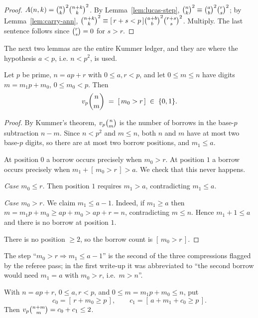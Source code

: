 \begin{proof}
$A(n,k)=\binom{n}{k}^2\binom{n+k}{k}^2$. By Lemma~\ref{lem:lucas-step},
$\binom{n}{k}^2\equiv\binom{a}{b}^2\binom{r}{s}^2$; by Lemma~\ref{lem:carry-ann},
$\binom{n+k}{k}^2\equiv[\,r+s<p\,]\binom{a+b}{b}^2\binom{r+s}{s}^2$. Multiply. The last sentence
follows since $\binom{r}{s}=0$ for $s>r$.
\end{proof}

The next two lemmas are the entire Kummer ledger, and they are where the hypothesis
$a<p$, i.e. $n<p^2$, is used.

\begin{lemma}\label{lem:borrow}
Let $p$ be prime, $n=ap+r$ with $0\le a,r<p$, and let $0\le m\le n$ have digits
$m=m_1p+m_0$, $0\le m_0<p$. Then
\[
  v_p\binom{n}{m}\;=\;[\,m_0>r\,]\;\in\;\{0,1\}.
\]
\end{lemma}

\begin{proof}
By Kummer's theorem, $v_p\binom{n}{m}$ is the number of borrows in the base-$p$ subtraction
$n-m$. Since $n<p^2$ and $m\le n$, both $n$ and $m$ have at most two base-$p$ digits, so
there are at most two borrow positions, and $m_1\le a$.

At position $0$ a borrow occurs precisely when $m_0>r$. At position $1$ a borrow occurs
precisely when $m_1+[\,m_0>r\,]>a$. We check that this never happens.

\emph{Case $m_0\le r$.} Then position $1$ requires $m_1>a$, contradicting $m_1\le a$.

\emph{Case $m_0>r$.} We claim $m_1\le a-1$. Indeed, if $m_1\ge a$ then
$m=m_1p+m_0\ge ap+m_0>ap+r=n$, contradicting $m\le n$. Hence $m_1+1\le a$ and there is no
borrow at position $1$.

There is no position $\ge2$, so the borrow count is $[\,m_0>r\,]$.
\end{proof}

\begin{remark}
The step ``$m_0>r\Rightarrow m_1\le a-1$'' is the second of the three compressions flagged
by the referee pass; in the first write-up it was abbreviated to ``the second borrow would
need $m_1=a$ with $m_0>r$, i.e.\ $m>n$''.
\end{remark}

\begin{lemma}\label{lem:carrycount}
With $n=ap+r$, $0\le a,r<p$, and $0\le m=m_1p+m_0\le n$, put
\[
  c_0=[\,r+m_0\ge p\,],\qquad c_1=[\,a+m_1+c_0\ge p\,].
\]
Then $v_p\binom{n+m}{m}=c_0+c_1\le 2$.
\end{lemma}


